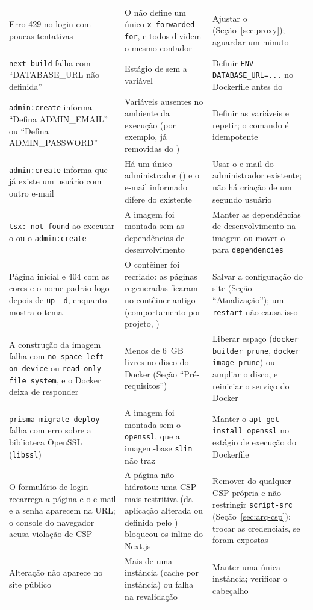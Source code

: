 \begin{longtable}{@{}L{4.2cm}L{4.5cm}L{5.3cm}@{}}
Erro 429 no login com poucas tentativas & O  não define um único \texttt{x-forwarded-for}, e todos dividem o mesmo contador & Ajustar o  (Seção~\ref{sec:proxy}); aguardar um minuto\\[1pt]
\texttt{next build} falha com ``DATABASE\_URL não definida'' & Estágio de  sem a variável & Definir \texttt{ENV DATABASE\_URL=...} no Dockerfile antes do \\[1pt]
\texttt{admin:create} informa ``Defina ADMIN\_EMAIL'' ou ``Defina ADMIN\_PASSWORD'' & Variáveis ausentes no ambiente da execução (por exemplo, já removidas do ) & Definir as variáveis e repetir; o comando é idempotente\\[1pt]
\texttt{admin:create} informa que já existe um usuário com outro e-mail & Há um único administrador () e o e-mail informado difere do existente & Usar o e-mail do administrador existente; não há criação de um segundo usuário\\[1pt]
\texttt{tsx: not found} ao executar o  ou o \texttt{admin:create} & A imagem foi montada sem as dependências de desenvolvimento & Manter as dependências de desenvolvimento na imagem ou mover o  para \texttt{dependencies}\\[1pt]
Página inicial e 404 com as cores e o nome padrão logo depois de \texttt{up -d}, enquanto  mostra o tema & O contêiner foi recriado: as páginas regeneradas ficaram no contêiner antigo (comportamento por projeto, ) & Salvar a configuração do site (Seção ``Atualização''); um \texttt{restart} não causa isso\\[1pt]
A construção da imagem falha com \texttt{no space left on device} ou \texttt{read-only file system}, e o Docker deixa de responder & Menos de 6~GB livres no disco do Docker (Seção ``Pré-requisitos'') & Liberar espaço (\texttt{docker builder prune}, \texttt{docker image prune}) ou ampliar o disco, e reiniciar o serviço do Docker\\[1pt]
\texttt{prisma migrate deploy} falha com erro sobre a biblioteca OpenSSL (\texttt{libssl}) & A imagem foi montada sem o \texttt{openssl}, que a imagem-base \texttt{slim} não traz & Manter o \texttt{apt-get install openssl} no estágio de execução do Dockerfile\\[1pt]
O formulário de login recarrega a página e o e-mail e a senha aparecem na URL; o console do navegador acusa violação de CSP & A página não hidratou: uma CSP mais restritiva (da aplicação alterada ou definida pelo ) bloqueou os  inline do Next.js & Remover do  qualquer CSP própria e não restringir \texttt{script-src} (Seção~\ref{sec:arq-csp}); trocar as credenciais, se foram expostas\\[1pt]
Alteração não aparece no site público & Mais de uma instância (cache por instância) ou falha na revalidação & Manter uma única instância; verificar o cabeçalho \\[1pt]
\end{longtable}
